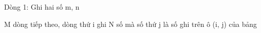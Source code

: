 Dòng 1: Ghi hai số m, n

M dòng tiếp theo, dòng thứ i ghi N số mà số thứ j là số ghi trên ô (i, j) của bảng

\